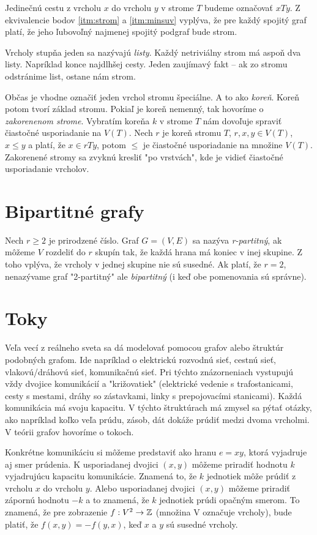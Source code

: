 Jedinečnú cestu z vrcholu $x$ do vrcholu $y$ v strome $T$ budeme označovať 
$xTy$. Z ekvivalencie bodov \ref{itm:strom} a \ref{itm:minsuv} vyplýva, 
že pre každý spojitý graf platí, že jeho ľubovoľný najmenej spojitý podgraf 
bude strom.

Vrcholy stupňa jeden sa nazývajú \emph{listy}. Každý netriviálny strom má aspoň 
dva listy. Napríklad konce najdlhšej cesty. Jeden zaujímavý fakt -- ak zo 
stromu odstránime list, ostane nám strom.

Občas je vhodne označiť jeden vrchol stromu špeciálne. A to ako \emph{koreň}. 
Koreň potom tvorí základ stromu. Pokiaľ je koreň nemenný, tak hovoríme 
o \emph{zakorenenom strome}. Vybratím koreňa $k$ v strome $T$ nám dovoľuje 
spraviť čiastočné usporiadanie na $V(T)$. Nech $r$ je koreň stromu $T$, 
$r, x, y \in V(T)$, $x \leq y$ a platí, že $x \in rTy$, potom $\leq$ je 
čiastočné usporiadanie na množine $V(T)$. Zakorenené stromy sa zvyknú kresliť 
"po vrstvách", kde je vidieť čiastočné usporiadanie vrcholov.


\section{Bipartitné grafy}

Nech $r \geq 2$ je prirodzené číslo. Graf $G = (V, E)$ sa nazýva 
\emph{r-partitný}, ak môžeme $V$ rozdeliť do $r$ skupín tak, že každá hrana 
má koniec v inej skupine. Z toho vplýva, že vrcholy v jednej skupine nie sú 
susedné. Ak platí, že  $r = 2$, nenazývame graf "2-partitný" ale 
\emph{bipartitný} (i keď obe pomenovania sú správne).

\section{Toky}

Veľa vecí z reálneho sveta sa dá modelovať pomocou grafov alebo štruktúr 
podobných grafom. Ide napríklad o elektrickú rozvodnú sieť, cestnú sieť, 
vlakovú/dráhovú sieť, komunikačnú sieť. Pri týchto znázorneniach vystupujú 
vždy dvojice komunikácií a "križovatiek" (elektrické vedenie s trafostanicami, 
cesty s mestami, dráhy so zástavkami, linky s prepojovacími stanicami). Každá 
komunikácia má svoju kapacitu. V týchto štruktúrach má zmysel sa pýtať otázky, 
ako napríklad koľko veľa prúdu, zásob, dát dokáže prúdiť medzi dvoma vrcholmi. 
V teórii grafov hovoríme o tokoch. 

Konkrétne komunikáciu si môžeme predstaviť ako hranu $e = xy$, ktorá vyjadruje 
aj smer prúdenia. K usporiadanej dvojici $(x, y)$ môžeme priradiť hodnotu $k$ 
vyjadrujúcu kapacitu komunikácie. Znamená to, že $k$ jednotiek môže prúdiť z 
vrcholu $x$ do vrcholu $y$. Alebo usporiadanej dvojici $(x, y)$ môžeme priradiť
zápornú hodnotu $-k$ a to znamená, že $k$ jednotiek prúdi opačným smerom. To 
znamená, že pre zobrazenie $f:V^2\rightarrow\mathbb{Z}$ (množina V označuje vrcholy), 
bude platiť, že $f(x,y) = -f(y,x)$, keď $x$ a $y$ sú susedné vrcholy.

